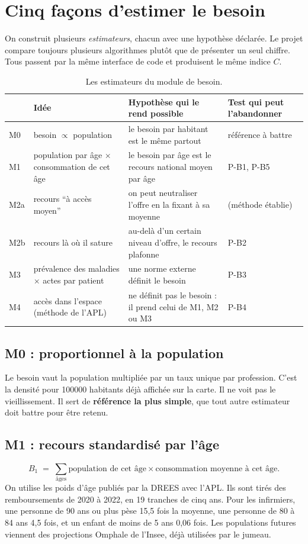 \documentclass[11pt]{article}
\begin{document}
\section{Cinq façons d'estimer le besoin}
On construit plusieurs \emph{estimateurs}, chacun avec une hypothèse déclarée. Le projet compare toujours plusieurs
algorithmes plutôt que de présenter un seul chiffre. Tous passent par la même interface de code et produisent le même
indice $C$.

\begin{table}[h]
\centering\small
\begin{tabularx}{\linewidth}{@{}l X X X@{}}
\toprule
& \textbf{Idée} & \textbf{Hypothèse qui le rend possible} & \textbf{Test qui peut l'abandonner} \\
\midrule
M0 & besoin $\propto$ population & le besoin par habitant est le même partout & référence à battre \\
M1 & population par âge $\times$ consommation de cet âge & le besoin par âge est le recours national moyen par âge & P-B1, P-B5 \\
M2a & recours \enquote{à accès moyen} & on peut neutraliser l'offre en la fixant à sa moyenne & (méthode établie) \\
M2b & recours là où il sature & au-delà d'un certain niveau d'offre, le recours plafonne & P-B2 \\
M3 & prévalence des maladies $\times$ actes par patient & une norme externe définit le besoin & P-B3 \\
M4 & accès dans l'espace (méthode de l'APL) & ne définit pas le besoin : il prend celui de M1, M2 ou M3 & P-B4 \\
\bottomrule
\end{tabularx}
\caption{Les estimateurs du module de besoin.}
\end{table}

\subsection*{M0 : proportionnel à la population}
Le besoin vaut la population multipliée par un taux unique par profession. C'est la densité pour \num{100000}
habitants déjà affichée sur la carte. Il ne voit pas le vieillissement. Il sert de \textbf{référence la plus simple},
que tout autre estimateur doit battre pour être retenu.

\subsection*{M1 : recours standardisé par l'âge}
\[
B_1 \;=\; \sum_{\text{âges}} \text{population de cet âge} \times \text{consommation moyenne à cet âge}.
\]
On utilise les poids d'âge publiés par la DREES avec l'APL. Ils sont tirés des remboursements de 2020 à 2022\mesure{},
en 19 tranches de cinq ans. Pour les infirmiers, une personne de 90 ans ou plus pèse 15,5\mesure{} fois la moyenne,
une personne de 80 à 84 ans 4,5\mesure{} fois, et un enfant de moins de 5 ans 0,06\mesure{} fois. Les populations
futures viennent des projections Omphale de l'Insee, déjà utilisées par le jumeau.
\end{document}

